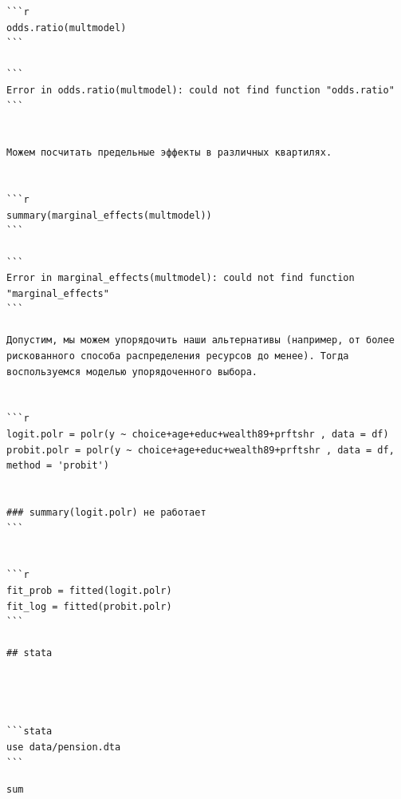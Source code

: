 \documentclass[]{book}
\begin{document}
\begin{verbatim}
```r
odds.ratio(multmodel) 
```

```
Error in odds.ratio(multmodel): could not find function "odds.ratio"
```


Можем посчитать предельные эффекты в различных квартилях. 


```r
summary(marginal_effects(multmodel)) 
```

```
Error in marginal_effects(multmodel): could not find function "marginal_effects"
```

Допустим, мы можем упорядочить наши альтернативы (например, от более рискованного способа распределения ресурсов до менее). Тогда воспользуемся моделью упорядоченного выбора.


```r
logit.polr = polr(y ~ choice+age+educ+wealth89+prftshr , data = df)
probit.polr = polr(y ~ choice+age+educ+wealth89+prftshr , data = df, method = 'probit') 


### summary(logit.polr) не работает
```


```r
fit_prob = fitted(logit.polr)
fit_log = fitted(probit.polr)
```

## stata




```stata
use data/pension.dta
```
\end{verbatim}

\begin{verbatim}
sum
\end{verbatim}
\end{document}
